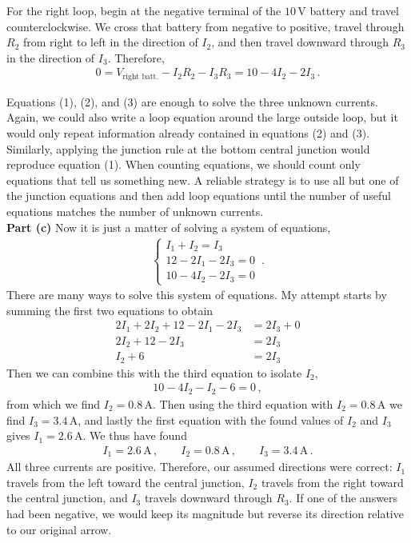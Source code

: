 \documentclass[11pt]{article}
\begin{document}
For the right loop, begin at the negative terminal of the $10$\,V battery and travel counterclockwise. We cross that battery from negative to positive, travel through $R_2$ from right to left in the direction of $I_2$, and then travel downward through $R_3$ in the direction of $I_3$. Therefore,
\begin{align*}
0=V_{\text{right batt.}}-I_2R_2-I_3R_3=10-4I_2-2I_3\,. \tag{3}
\end{align*}

Equations (1), (2), and (3) are enough to solve the three unknown currents. Again, we could also write a loop equation around the large outside loop, but it would only repeat information already contained in equations (2) and (3). Similarly, applying the junction rule at the bottom central junction would reproduce equation (1). When counting equations, we should count only equations that tell us something new. A reliable strategy is to use all but one of the junction equations and then add loop equations until the number of useful equations matches the number of unknown currents.\\

\noindent\textbf{Part (c)} Now it is just a matter of solving a system of equations,
\begin{align*}
\begin{cases}
I_1+I_2 = I_3\\
12-2I_1 - 2I_3=0\\
10 - 4I_2 - 2I_3=0
\end{cases}\,.
\end{align*}
There are many ways to solve this system of equations. My attempt starts by summing the first two equations to obtain
\begin{align*}
2I_1 + 2I_2 + 12 - 2I_1 - 2I_3 &= 2I_3 +0\\
 2I_2 + 12 - 2I_3 &= 2I_3\\
  I_2 + 6  &= 2I_3
\end{align*}
Then we can combine this with the third equation to isolate $I_2$, 
\begin{align*}
10 - 4I_2 - I_2 -6 = 0\,,
\end{align*}
from which we find
$I_2 = 0.8\,\text{A}
$. Then using the third equation with $I_2 = 0.8\,\text{A}$ we find $I_3 = 3.4\,\text{A}$, and lastly the first equation with the found values of $I_2$ and $I_3$ gives $I_1 = 2.6\,\text{A}$. We thus have found
\begin{align*}
I_1 = 2.6\,\text{A}\,,\qquad
I_2 = 0.8 \,\text{A}\,,\qquad
I_3 = 3.4\,\text{A}\,.
\end{align*}
All three currents are positive. Therefore, our assumed directions were correct: $I_1$ travels from the left toward the central junction, $I_2$ travels from the right toward the central junction, and $I_3$ travels downward through $R_3$. If one of the answers had been negative, we would keep its magnitude but reverse its direction relative to our original arrow.\\
\end{document}
